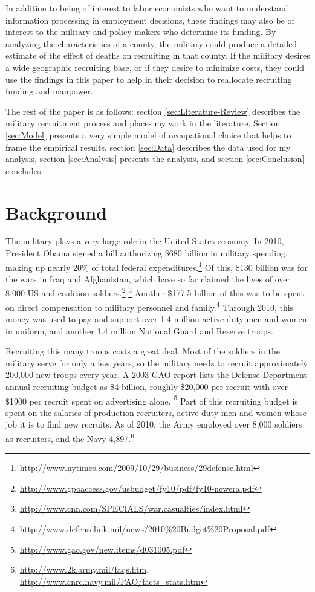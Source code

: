 \documentclass[12pt] {article}
\begin{document}
In addition to being of interest to labor economists who want to understand information processing in employment decisions, these findings may also be of interest to the military and policy makers who determine its funding. By analyzing the characteristics
of a county, the military could produce a detailed estimate of the
effect of deaths on recruiting in that county. If the military desires
a wide geographic recruiting base, or if they desire to minimize costs,
they could use the findings in this paper to help in their decision
to reallocate recruiting funding and manpower. 

The rest of the paper is as follows: section \ref{sec:Literature-Review} describes the military
recruitment process and places my work in the literature. Section
\ref{sec:Model} presents a very simple model of occupational choice
that helps to frame the empirical results, section \ref{sec:Data} describes the
data used for my analysis, section \ref{sec:Analysis} presents the analysis, and section
\ref{sec:Conclusion} concludes.



\section{Background\label{sec:Literature-Review}}
The military plays a very large role in the United States economy.
In 2010, President Obama signed a bill authorizing \$680 billion in
military spending, making up nearly 20\% of total federal expenditures.\footnote{\url{http://www.nytimes.com/2009/10/29/business/29defense.html}} Of this, \$130 billion was for the wars in Iraq and Afghanistan, which have so far claimed the lives of over 8,000 US and coalition
soldiers.\footnote{\url{http://www.gpoaccess.gov/usbudget/fy10/pdf/fy10-newera.pdf}}
\footnote{\url{http://www.cnn.com/SPECIALS/war.casualties/index.html}
} Another \$177.5 billion of this was to be spent on direct compensation
to military personnel and family.\footnote{\url{http://www.defenselink.mil/news/2010\%20Budget\%20Proposal.pdf}} Through 2010, this money was used to pay and support over
1.4 million active duty men and women in uniform, and another 1.4
million National Guard and Reserve troops. 

Recruiting this many troops costs a great deal. Most of the soldiers
in the military serve for only a few years, so the military needs
to recruit approximately 200,000 new troops every year. A 2003 GAO
report lists the Defense Department annual recruiting budget as \$4
billion, roughly \$20,000 per recruit with over \$1900 per recruit
spent on advertising alone.%
\footnote{\url{http://www.gao.gov/new.items/d031005.pdf}
} Part of this recruiting budget is spent on the salaries of production
recruiters, active-duty men and women whose job it is to find new
recruits. As of 2010, the Army employed over 8,000 soldiers as recruiters,
and the Navy 4,897.\footnote{\url{http://www.2k.army.mil/faqs.htm}, \url{http://www.cnrc.navy.mil/PAO/facts\_stats.htm}
} 
\end{document}
